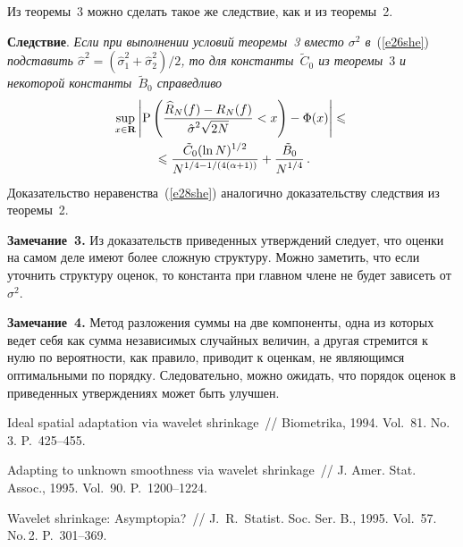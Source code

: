 \begin{multicols}{2}
\medskip

 Из теоремы~3 можно сделать такое же следствие, как и из теоремы~2.
 
 \medskip
 
 \noindent
\textbf{Следствие}. \textit{Если при выполнении условий теоремы~3 вместо $\sigma^2$ в}~(\ref{e26she}) 
\textit{подставить $\hat{\sigma}^2=(\hat{\sigma}_1^2+\hat{\sigma}_2^2)/2$, то для константы~$\tilde{C}_0$ из теоремы}~3 
\textit{и некоторой константы~$\tilde{B}_0$ справедливо}
\begin{multline}
\sup\limits_{x\in\mathbf{R}}\left\vert\mbox{P}\left(\displaystyle\frac{\displaystyle \widehat{R}_N(f)-R_N(f)\mathstrut}{\displaystyle \hat{\sigma}^2\sqrt{2N}\mathstrut}<x\right)-
\Phi(x)\right\vert\leqslant{}\\
{}\leqslant\displaystyle\frac{\displaystyle \tilde{C}_0(\ln N)^{1/2}\mathstrut}{\displaystyle N^{1/4-1/(4(\alpha+1))}\mathstrut}+\displaystyle\frac{\displaystyle \tilde{B}_0\mathstrut}{\displaystyle N^{1/4}\mathstrut}\,.
\label{e28she}
\end{multline}
Доказательство неравенства~(\ref{e28she}) аналогично доказательству следствия из теоремы~2.

\medskip

\noindent
\textbf{Замечание~3.} Из доказательств приведенных утверждений следует, 
что оценки на самом деле имеют более сложную структуру. Можно заметить, что если уточнить структуру
оценок, то константа при главном члене не будет зависеть от~$\sigma^2$.
\smallskip

\noindent
\textbf{Замечание~4.} Метод разложения суммы на две компоненты, одна из которых ведет себя 
как сумма независимых случайных величин, а другая стремится к нулю по вероятности, как правило, 
приводит к оценкам, не являющимся оптимальными по порядку. Следовательно, можно ожидать, что 
порядок оценок в приведенных утверждениях может быть улучшен.


{\small\frenchspacing
{%
\begin{thebibliography}{99}

Ideal spatial adaptation via wavelet shrinkage~// Biometrika, 1994. Vol.~81. No.\,3. P.~425--455.

Adapting to unknown smoothness via wavelet shrinkage~// J. Amer. Stat. Assoc., 1995. Vol.~90. P.~1200--1224.


Wavelet shrinkage: Asymp\-to\-pia?~// J.~R.~Statist. Soc. Ser. B., 1995. Vol.~57. No.\,2. P.~301--369.


\end{thebibliography}}}
\end{multicols}
